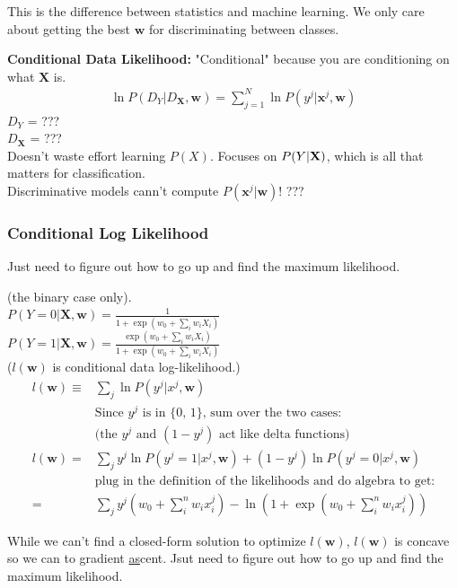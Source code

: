 This is the difference between statistics and machine learning.  We only care about getting the best $\bm{w}$ for discriminating between classes. 

\textbf{Conditional Data Likelihood:} 
"Conditional" because you are conditioning on what $\bm{X}$ is. 
\begin{align*}
	\ln P(D_Y | D_{\bm{X}}, \bm{w}) = \sum_{j=1}^N \ln P(y^j | \bm{x}^j, \bm{w})
\end{align*}
$D_Y$ = ???  \hfill \\
$D_{\bm{X}}$ = ???   \hfill \\
Doesn't waste effort learning $P(X)$.  Focuses on $P(Y| \bf{X})$, which is all that matters for classification. \hfill \\
Discriminative models cann't compute $P(\bm{x}^j | \bm{w})$!  ??? 
\hfill \\

\subsubsection{Conditional Log Likelihood}
Just need to figure out how to go up and find the maximum likelihood. 

(the binary case only).  \hfill \\
$P(Y=0 | \bm{X}, \bm{w}) = \frac{1}{1 + \exp(w_0 + \sum_i w_i X_i)}$  \hfill \\
$P(Y=1 | \bm{X}, \bm{w}) = \frac{\exp(w_0 + \sum_i w_i X_i)}{1 + \exp(w_0 + \sum_i w_i X_i)}$  \hfill \\

($ l( \bm{w} )$ is conditional data log-likelihood.)  
\begin{align*}
	l( \bm{w})  \equiv  &  \sum_j \ln P(y^j | x^j, \bm{w})  \\
	& \mbox{Since $y^j$ is in \{0, 1\}, sum over the two cases: }   \\
	& \mbox{(the $y^j$ and $(1-y^j)$ act like delta functions)}   \\
	l(\bm{w})  =  & \sum_j y^j \ln P(y^j = 1 | x^j, \bm{w}) +(1 - y^j) \ln P(y^j = 0 | x^j, \bm{w})  \\
	& \mbox{plug in the definition of the likelihoods and do algebra to get:}  \\
	=& \sum_j  y^j (w_0 + \sum_i^n w_i x_i^j)  - \ln(1 + \exp(w_0 + \sum_i^n w_i x_i^j)) 
\end{align*}	

While we can't find a closed-form solution to optimize $l(\bm{w})$,  $l(\bm{w})$ is concave so we can to gradient \underline{as}cent. 
Jsut need to figure out how to go up and find the maximum likelihood.   %

